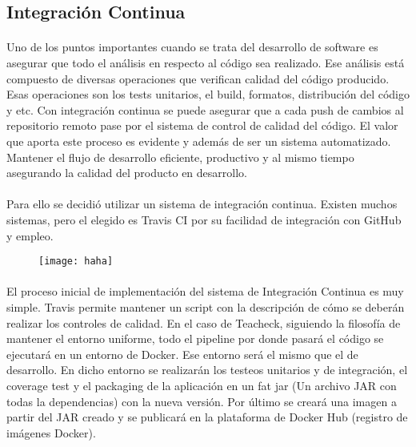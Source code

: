 \subsection{Integración Continua}
\paragraph{}
Uno de los puntos importantes cuando se trata del desarrollo de software es asegurar que todo el análisis en respecto al código sea realizado. Ese análisis está compuesto de diversas operaciones que verifican calidad del código producido. Esas operaciones son los tests unitarios, el build, formatos, distribución del código y etc. Con integración continua se puede asegurar que a cada push de cambios al repositorio remoto pase por el sistema de control de calidad del código. El valor que aporta este proceso es evidente y además de ser un sistema automatizado. Mantener el flujo de desarrollo eficiente, productivo y al mismo tiempo asegurando la calidad del producto en desarrollo.

\paragraph{}
Para ello se decidió utilizar un sistema de integración continua. Existen muchos sistemas, pero el elegido es Travis CI por su facilidad de integración con GitHub y empleo.
\begin{figure}
  \texttt{[image: haha]}
\end{figure}
\paragraph{}
El proceso inicial de implementación del sistema de Integración Continua es muy simple. Travis permite mantener un script con la descripción de cómo se deberán realizar los controles de calidad. En el caso de Teacheck, siguiendo la filosofía de mantener el entorno uniforme, todo el pipeline por donde pasará el código se ejecutará en un entorno de Docker. Ese entorno será el mismo que el de desarrollo. En dicho entorno se realizarán los testeos unitarios y de integración, el coverage test y el packaging de la aplicación en un fat jar (Un archivo JAR con todas la dependencias) con la nueva versión. Por último se creará una imagen a partir del JAR creado y se publicará en la plataforma de Docker Hub (registro de imágenes Docker). 

